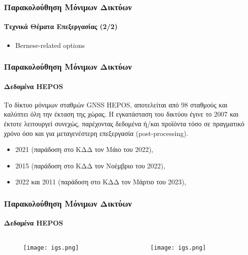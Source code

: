 \begin{frame}
  \frametitle{Παρακολούθηση Μόνιμων Δικτύων}
  \framesubtitle{Τεχνικά Θέματα Επεξεργασίας (2/2)}
  \label{}

    \begin{itemize}
        \item Bernese-related options
    \end{itemize}
\end{frame}
\note{}

\begin{frame}
  \frametitle{Παρακολούθηση Μόνιμων Δικτύων}
  \framesubtitle{Δεδομένα HEPOS}
  \label{}

    Το δίκτυο μόνιμων σταθμών GNSS HEPOS, αποτελείται από 98 σταθμούς και καλύπτει όλη την
    έκταση της χώρας. Η εγκατάσταση του δικτύου έγινε το 2007 και έκτοτε λειτουργεί
    συνεχώς, παρέχοντας δεδομένα ή/και προϊόντα τόσο σε πραγματικό χρόνο όσο και για
    μεταγενέστερη επεξεργασία (post-processing).
    \vspace{0.3cm}

    \begin{itemize}
        \item 2021 (παράδοση στο ΚΔΔ τον Μάιο του 2022),
        \item 2015 (παράδοση στο ΚΔΔ τον Νοέμβριο του 2022),
        \item 2022 και 2011 (παράδοση στο ΚΔΔ τον Μάρτιο του 2023),
    \end{itemize}
\end{frame}
\note{}

\begin{frame}
  \frametitle{Παρακολούθηση Μόνιμων Δικτύων}
  \framesubtitle{Δεδομένα HEPOS}
  \label{}

    \begin{columns}[c]
        \begin{column}{.5\textwidth}
        \begin{figure}
            \centering
            \texttt{[image: igs.png]}
        \end{figure}
        \end{column}
        \begin{column}{.5\textwidth}
        \begin{figure}
            \centering
            \texttt{[image: igs.png]}
        \end{figure}
        \end{column}
    \end{columns}
\end{frame}
\note{}
